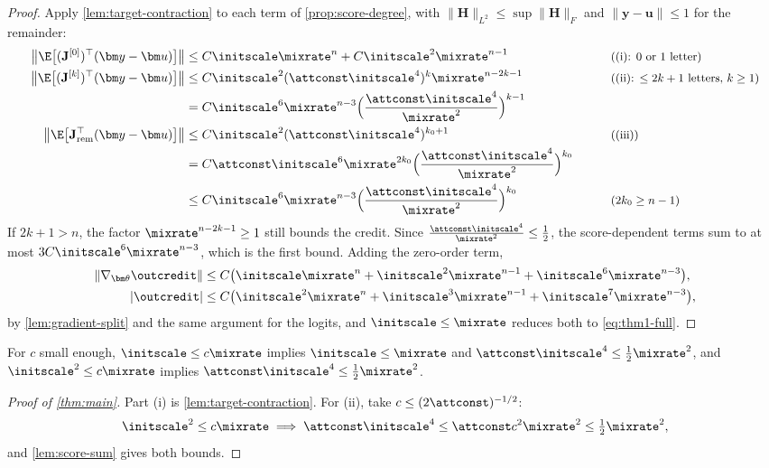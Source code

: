 \begin{proof}
Apply \cref{lem:target-contraction} to each term of \cref{prop:score-degree}, with $\|\mathbf H\|_{L^2}\le\sup\|\mathbf H\|_F$ and $\|\bm y-\bm u\|\le1$ for the remainder:
\begin{alignat*}{2}
 \bigl\|\E\bigl[(\mathbf J^{[0]})^\top(\bm y-\bm u)\bigr]\bigr\|&\le C\initscale\mixrate^n+C\initscale^2\mixrate^{n-1} &\qquad& \why{(i): $0$ or $1$ letter}\\
 \bigl\|\E\bigl[(\mathbf J^{[k]})^\top(\bm y-\bm u)\bigr]\bigr\|&\le C\initscale^2(\attconst\initscale^4)^k\mixrate^{n-2k-1} && \why{(ii): $\le2k+1$ letters, $k\ge1$}\\
 &=C\initscale^6\mixrate^{n-3}\Bigl(\frac{\attconst\initscale^4}{\mixrate^2}\Bigr)^{k-1} && \\
 \bigl\|\E\bigl[\mathbf J_{\mathrm{rem}}^\top(\bm y-\bm u)\bigr]\bigr\|&\le C\initscale^2(\attconst\initscale^4)^{k_0+1} && \why{(iii)}\\
 &=C\attconst\initscale^6\mixrate^{2k_0}\Bigl(\frac{\attconst\initscale^4}{\mixrate^2}\Bigr)^{k_0} && \\
 &\le C\initscale^6\mixrate^{n-3}\Bigl(\frac{\attconst\initscale^4}{\mixrate^2}\Bigr)^{k_0} && \why{$2k_0\ge n-1$}
\end{alignat*}
If $2k+1>n$, the factor $\mixrate^{n-2k-1}\ge1$ still bounds the credit. Since $\frac{\attconst\initscale^4}{\mixrate^2}\le\frac{1}{2}$, the
score-dependent terms sum to at most $3C\initscale^6\mixrate^{n-3}$, which is the first bound. Adding the zero-order term,
\begin{align*}
 \|\nabla_{\bm\theta}\outcredit\|&\le C\bigl(\initscale\mixrate^n+\initscale^2\mixrate^{n-1}+\initscale^6\mixrate^{n-3}\bigr),\\
 |\outcredit|&\le C\bigl(\initscale^2\mixrate^n+\initscale^3\mixrate^{n-1}+\initscale^7\mixrate^{n-3}\bigr),
\end{align*}
by \cref{lem:gradient-split} and the same argument for the logits, and $\initscale\le\mixrate$ reduces both to \cref{eq:thm1-full}.
\end{proof}

For $c$ small enough, $\initscale\le c\mixrate$ implies $\initscale\le\mixrate$ and $\attconst\initscale^4\le\frac{1}{2}\mixrate^2$, and $\initscale^2\le c\mixrate$ implies $\attconst\initscale^4\le\frac{1}{2}\mixrate^2$.

\begin{proof}[Proof of \cref{thm:main}]
Part (i) is \cref{lem:target-contraction}. For (ii), take $c\le(2\attconst)^{-1/2}$:
\[
 \initscale^2\le c\mixrate\implies \attconst\initscale^4\le\attconst c^2\mixrate^2\le\tfrac{1}{2}\mixrate^2,
\]
and \cref{lem:score-sum} gives both bounds.
\end{proof}

